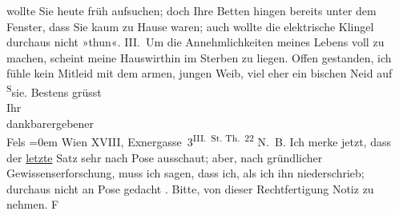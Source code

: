 \begin{ledgroupsized}[t]{13cm}
                    wollte Sie heute früh aufsuchen; doch Ihre Betten hingen bereits {\pb}unter dem Fenster, dass Sie kaum zu Hause waren;
                    auch wollte die elektrische Klingel durchaus nicht »thun«.\pend
           \pstart
           III. Um die Annehmlichkeiten meines Lebens voll zu machen, scheint meine Hauswirthin im Sterben zu
                    liegen. Offen gestanden, ich fühle kein Mitleid mit dem armen, jungen Weib, viel
                    eher ein bischen Neid auf \substVorne{}\textsuperscript{S}\substDazwischen{}s\substHinten{}ie.\pend
           \pstart
           Bestens grüsst{\\[\baselineskip]}Ihr{\\[\baselineskip]}dankbarergebener{\\[\baselineskip]}\spacefill\mbox{Fels}\pend
           \leftskip=0em{}\pstart
           \noindent{}Wien XVIII, Exnergasse 3\textsuperscript{III. St. Th. 22}\pend
           \pstart
           N. B. Ich merke jetzt, dass der \uline{letzte} Satz
                        sehr nach Pose ausschaut; aber, nach gründlicher Gewissenserforschung, muss
                        ich sagen, dass ich, als ich ihn niederschrieb; durchaus nicht an Pose
                        gedacht \label{T_L00326_1v}\label{T_L00326_1h}. Bitte, von dieser
                        Rechtfertigung Notiz zu nehmen. \spacefill\mbox{F}\pend
           \endnumbering{}\end{ledgroupsized}  \newcommand{\dateiname}{L00326}\newcommand{\titel}{Friedrich M. Fels an Arthur Schnitzler, [17. 5. 1894]}\newcommand{\editorInnen}{Martin Anton Müller und Gerd-Hermann Susen}
            \footnotesize
\begin{ledgroupsized}[t]{11.5cm}
\end{ledgroupsized}
         
      